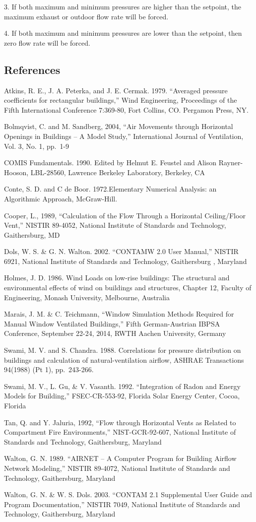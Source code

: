 3. If both maximum and minimum pressures are higher than the setpoint, the maximum exhaust or outdoor flow rate will be forced. 

4. If both maximum and minimum pressures are lower than the setpoint, then zero flow rate will be forced.

\subsection{References}\label{references-004}

Atkins, R. E., J. A. Peterka, and J. E. Cermak. 1979. ``Averaged pressure coefficients for rectangular buildings,'' Wind Engineering, Proceedings of the Fifth International Conference 7:369-80, Fort Collins, CO. Pergamon Press, NY.

Bolmqvist, C. and M. Sandberg, 2004, ``Air Movements through Horizontal Openings in Buildings -- A Model Study,'' International Journal of Ventilation, Vol. 3, No. 1, pp.~1-9

COMIS Fundamentals. 1990. Edited by Helmut E. Feustel and Alison Rayner-Hooson, LBL-28560, Lawrence Berkeley Laboratory, Berkeley, CA

Conte, S. D. and C de Boor. 1972.Elementary Numerical Analysis: an Algorithmic Approach, McGraw-Hill.

Cooper, L., 1989, ``Calculation of the Flow Through a Horizontal Ceiling/Floor Vent,'' NISTIR 89-4052, National Institute of Standards and Technology, Gaithersburg, MD

Dols, W. S. \& G. N. Walton. 2002. ``CONTAMW 2.0 User Manual,'' NISTIR 6921, National Institute of Standards and Technology, Gaithersburg , Maryland

Holmes, J. D. 1986. Wind Loads on low-rise buildings: The structural and environmental effects of wind on buildings and structures, Chapter 12, Faculty of Engineering, Monash University, Melbourne, Australia

Marais, J. M. \& C. Teichmann, ``Window Simulation Methods Required for Manual Window Ventilated Buildings,'' Fifth German-Austrian IBPSA Conference, September 22-24, 2014, RWTH Aachen University, Germany

Swami, M. V. and S. Chandra. 1988. Correlations for pressure distribution on buildings and calculation of natural-ventilation airflow, ASHRAE Transactions 94(1988) (Pt 1), pp.~243-266.

Swami, M. V., L. Gu, \& V. Vasanth. 1992. ``Integration of Radon and Energy Models for Building,'' FSEC-CR-553-92, Florida Solar Energy Center, Cocoa, Florida

Tan, Q. and Y. Jaluria, 1992, ``Flow through Horizontal Vents as Related to Compartment Fire Environments,'' NIST-GCR-92-607, National Institute of Standards and Technology, Gaithersburg, Maryland

Walton, G. N. 1989. ``AIRNET -- A Computer Program for Building Airflow Network Modeling,'' NISTIR 89-4072, National Institute of Standards and Technology, Gaithersburg, Maryland

Walton, G. N. \& W. S. Dols. 2003. ``CONTAM 2.1 Supplemental User Guide and Program Documentation,'' NISTIR 7049, National Institute of Standards and Technology, Gaithersburg, Maryland
